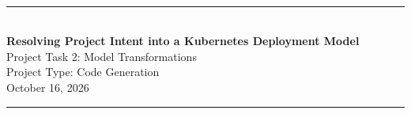 \begin{titlepage}

\newcommand{\HRule}{\rule{\linewidth}{0.5mm}}
\begin{center}
~\vspace{2cm}

\HRule \\[0.6cm]
\textbf{\LARGE Resolving Project Intent into a Kubernetes Deployment Model} \\[0.3cm]
Project Task 2: Model Transformations \\
Project Type: Code Generation \\
October 16, 2026\\[0.4cm]
\HRule \\[1.2cm]
\\[0.4cm]
\\
\\
\end{center}
\newpage
\end{titlepage}
